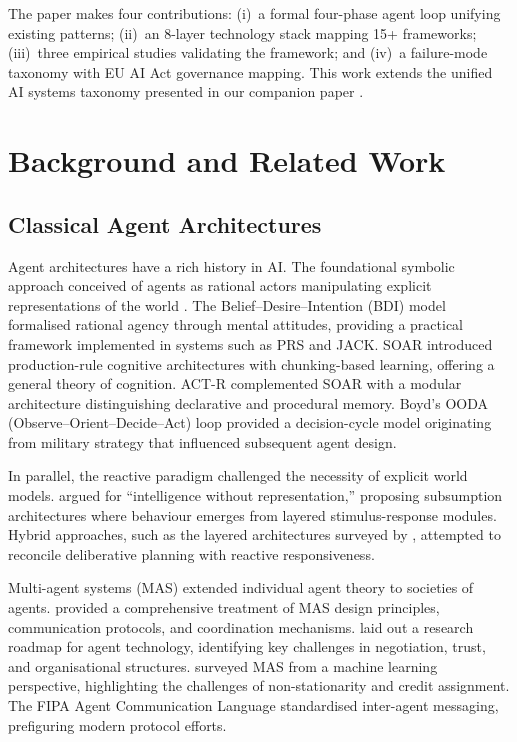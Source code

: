 \documentclass[review]{elsarticle}
\theoremstyle{definition}
\begin{document}
The paper makes four contributions: (i)~a formal four-phase agent loop unifying existing patterns; (ii)~an 8-layer technology stack mapping 15+ frameworks; (iii)~three empirical studies validating the framework; and (iv)~a failure-mode taxonomy with EU AI Act governance mapping. This work extends the unified AI systems taxonomy presented in our companion paper \citep{mahdi2026taxonomy}.

\section{Background and Related Work}\label{sec:background}

\subsection{Classical Agent Architectures}

Agent architectures have a rich history in AI. The foundational symbolic approach conceived of agents as rational actors manipulating explicit representations of the world \citep{newell1976computer,russell2021artificial}. The Belief--Desire--Intention (BDI) model \citep{rao1995bdi} formalised rational agency through mental attitudes, providing a practical framework implemented in systems such as PRS and JACK. SOAR \citep{laird2012soar} introduced production-rule cognitive architectures with chunking-based learning, offering a general theory of cognition. ACT-R \citep{anderson2004act} complemented SOAR with a modular architecture distinguishing declarative and procedural memory. Boyd's OODA (Observe--Orient--Decide--Act) loop \citep{boyd1987ooda} provided a decision-cycle model originating from military strategy that influenced subsequent agent design.

In parallel, the reactive paradigm challenged the necessity of explicit world models. \citet{brooks1991intelligence} argued for ``intelligence without representation,'' proposing subsumption architectures where behaviour emerges from layered stimulus-response modules. Hybrid approaches, such as the layered architectures surveyed by \citet{muller1996design}, attempted to reconcile deliberative planning with reactive responsiveness.

Multi-agent systems (MAS) extended individual agent theory to societies of agents. \citet{wooldridge2009introduction} provided a comprehensive treatment of MAS design principles, communication protocols, and coordination mechanisms. \citet{jennings1998roadmap} laid out a research roadmap for agent technology, identifying key challenges in negotiation, trust, and organisational structures. \citet{stone2000multiagent} surveyed MAS from a machine learning perspective, highlighting the challenges of non-stationarity and credit assignment. The FIPA Agent Communication Language \citep{fipa2002acl} standardised inter-agent messaging, prefiguring modern protocol efforts.
\end{document}
